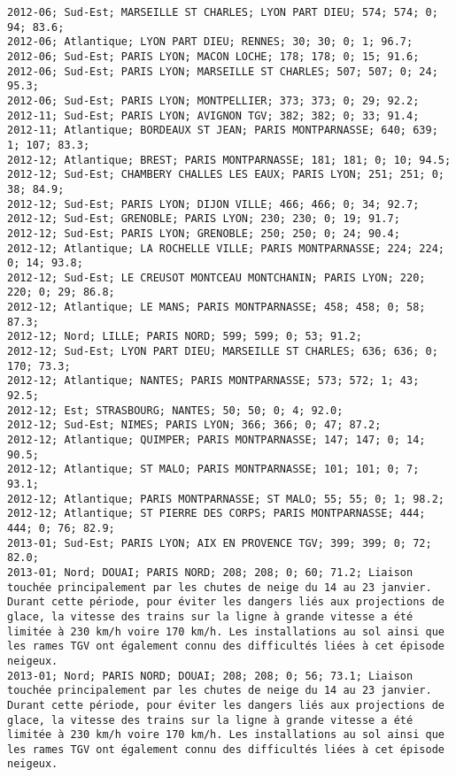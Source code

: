 \documentclass{article}
\begin{document}
\begin{Verbatim}[commandchars=\\\{\}]
2012-06; Sud-Est; MARSEILLE ST CHARLES; LYON PART DIEU; 574; 574; 0; 94; 83.6; 
2012-06; Atlantique; LYON PART DIEU; RENNES; 30; 30; 0; 1; 96.7; 
2012-06; Sud-Est; PARIS LYON; MACON LOCHE; 178; 178; 0; 15; 91.6; 
2012-06; Sud-Est; PARIS LYON; MARSEILLE ST CHARLES; 507; 507; 0; 24; 95.3; 
2012-06; Sud-Est; PARIS LYON; MONTPELLIER; 373; 373; 0; 29; 92.2; 
2012-11; Sud-Est; PARIS LYON; AVIGNON TGV; 382; 382; 0; 33; 91.4; 
2012-11; Atlantique; BORDEAUX ST JEAN; PARIS MONTPARNASSE; 640; 639; 1; 107; 83.3; 
2012-12; Atlantique; BREST; PARIS MONTPARNASSE; 181; 181; 0; 10; 94.5; 
2012-12; Sud-Est; CHAMBERY CHALLES LES EAUX; PARIS LYON; 251; 251; 0; 38; 84.9; 
2012-12; Sud-Est; PARIS LYON; DIJON VILLE; 466; 466; 0; 34; 92.7; 
2012-12; Sud-Est; GRENOBLE; PARIS LYON; 230; 230; 0; 19; 91.7; 
2012-12; Sud-Est; PARIS LYON; GRENOBLE; 250; 250; 0; 24; 90.4; 
2012-12; Atlantique; LA ROCHELLE VILLE; PARIS MONTPARNASSE; 224; 224; 0; 14; 93.8; 
2012-12; Sud-Est; LE CREUSOT MONTCEAU MONTCHANIN; PARIS LYON; 220; 220; 0; 29; 86.8; 
2012-12; Atlantique; LE MANS; PARIS MONTPARNASSE; 458; 458; 0; 58; 87.3; 
2012-12; Nord; LILLE; PARIS NORD; 599; 599; 0; 53; 91.2; 
2012-12; Sud-Est; LYON PART DIEU; MARSEILLE ST CHARLES; 636; 636; 0; 170; 73.3; 
2012-12; Atlantique; NANTES; PARIS MONTPARNASSE; 573; 572; 1; 43; 92.5; 
2012-12; Est; STRASBOURG; NANTES; 50; 50; 0; 4; 92.0; 
2012-12; Sud-Est; NIMES; PARIS LYON; 366; 366; 0; 47; 87.2; 
2012-12; Atlantique; QUIMPER; PARIS MONTPARNASSE; 147; 147; 0; 14; 90.5; 
2012-12; Atlantique; ST MALO; PARIS MONTPARNASSE; 101; 101; 0; 7; 93.1; 
2012-12; Atlantique; PARIS MONTPARNASSE; ST MALO; 55; 55; 0; 1; 98.2; 
2012-12; Atlantique; ST PIERRE DES CORPS; PARIS MONTPARNASSE; 444; 444; 0; 76; 82.9; 
2013-01; Sud-Est; PARIS LYON; AIX EN PROVENCE TGV; 399; 399; 0; 72; 82.0; 
2013-01; Nord; DOUAI; PARIS NORD; 208; 208; 0; 60; 71.2; Liaison touchée principalement par les chutes de neige du 14 au 23 janvier. Durant cette période, pour éviter les dangers liés aux projections de glace, la vitesse des trains sur la ligne à grande vitesse a été limitée à 230 km/h voire 170 km/h. Les installations au sol ainsi que les rames TGV ont également connu des difficultés liées à cet épisode neigeux.
2013-01; Nord; PARIS NORD; DOUAI; 208; 208; 0; 56; 73.1; Liaison touchée principalement par les chutes de neige du 14 au 23 janvier. Durant cette période, pour éviter les dangers liés aux projections de glace, la vitesse des trains sur la ligne à grande vitesse a été limitée à 230 km/h voire 170 km/h. Les installations au sol ainsi que les rames TGV ont également connu des difficultés liées à cet épisode neigeux.

\end{Verbatim}
\end{document}
